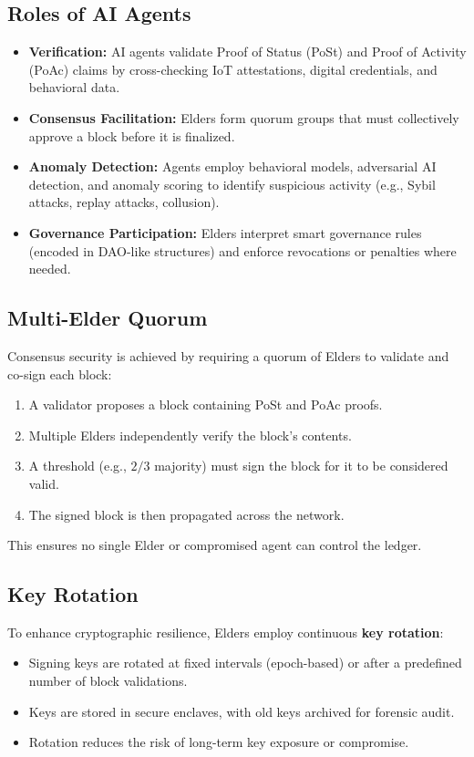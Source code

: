 \documentclass[11pt,a4paper]{article}
\begin{document}
\subsection{Roles of AI Agents}
\begin{itemize}
    \item \textbf{Verification:} AI agents validate Proof of Status (PoSt) and Proof of Activity (PoAc) claims by cross-checking IoT attestations, digital credentials, and behavioral data.
    \item \textbf{Consensus Facilitation:} Elders form quorum groups that must collectively approve a block before it is finalized.
    \item \textbf{Anomaly Detection:} Agents employ behavioral models, adversarial AI detection, and anomaly scoring to identify suspicious activity (e.g., Sybil attacks, replay attacks, collusion).
    \item \textbf{Governance Participation:} Elders interpret smart governance rules (encoded in DAO-like structures) and enforce revocations or penalties where needed.
\end{itemize}

\subsection{Multi-Elder Quorum}
Consensus security is achieved by requiring a quorum of Elders to validate and co-sign each block:
\begin{enumerate}
    \item A validator proposes a block containing PoSt and PoAc proofs.
    \item Multiple Elders independently verify the block’s contents.
    \item A threshold (e.g., $2/3$ majority) must sign the block for it to be considered valid.
    \item The signed block is then propagated across the network.
\end{enumerate}
This ensures no single Elder or compromised agent can control the ledger.

\subsection{Key Rotation}
To enhance cryptographic resilience, Elders employ continuous \textbf{key rotation}:
\begin{itemize}
    \item Signing keys are rotated at fixed intervals (epoch-based) or after a predefined number of block validations.
    \item Keys are stored in secure enclaves, with old keys archived for forensic audit.
    \item Rotation reduces the risk of long-term key exposure or compromise.
\end{itemize}
\end{document}
